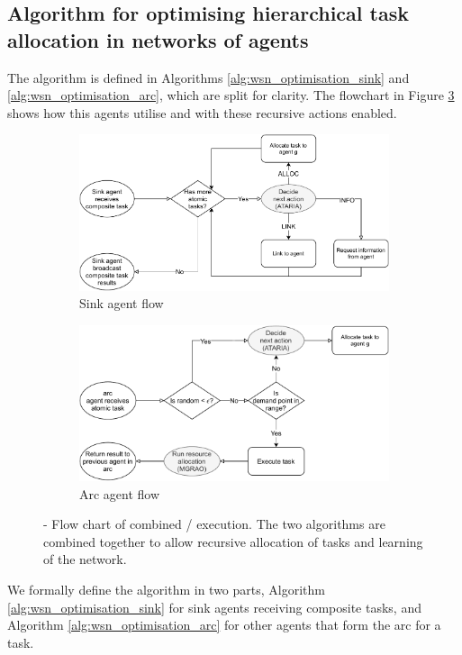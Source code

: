 \subsection{Algorithm for optimising hierarchical task allocation in networks of agents}

The \acronymWSNOptimisationExtended{}{} algorithm is defined in Algorithms \ref{alg:wsn_optimisation_sink}
and \ref{alg:wsn_optimisation_arc}, which are split for clarity. The flowchart in Figure \ref{fig:algorithm-flow} shows how this agents utilise \acronymATARIA{}{} and \acronymMGRAO{}{} with these recursive actions enabled. 
\begin{figure}[ht]
	\centering
	\begin{subfigure}{.49\textwidth}
		\centering
		\includegraphics[width=0.9\linewidth, trim={25pt 0pt 25pt 0pt, clip}]{algorithm-flow-sink}
		\caption{Sink agent flow}
		\label{fig:algorithm-flow-sink}
	\end{subfigure} \hfill%
	\begin{subfigure}{.49\textwidth}
		\centering	\includegraphics[width=0.9\linewidth,trim={25pt 0pt 25pt 0pt, clip}]{algorithm-flow-arc}
		\caption{Arc agent flow}
		\label{fig:algorithm-flow-arc}
	\end{subfigure}
	\caption{\textbf{\acronymWSNOptimisation{}{}} - Flow chart of combined \acronymATARIA{}{}/\acronymMGRAO{}{} execution. The two algorithms are combined together to allow recursive allocation of tasks and learning of the network.}
	\label{fig:algorithm-flow}
\end{figure}
We formally define the \acronymWSNOptimisation{}{} algorithm in two parts, Algorithm \ref{alg:wsn_optimisation_sink} for sink agents receiving composite tasks, and Algorithm \ref{alg:wsn_optimisation_arc} for other agents that form the arc for a task.

